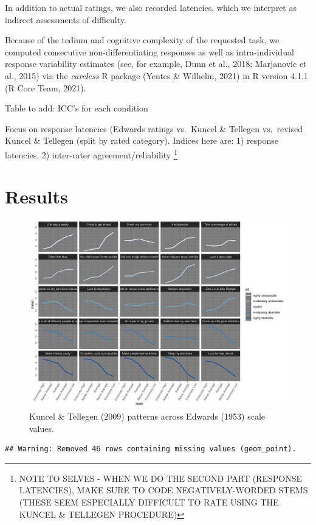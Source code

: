 \documentclass[
  ,man]{apa6}
\begin{document}
In addition to actual ratings, we also recorded latencies, which we interpret as indirect assessments of difficulty.

Because of the tedium and cognitive complexity of the requested task, we computed consecutive non-differentiating responses as well as intra-individual response variability estimates (see, for example, Dunn et al., 2018; Marjanovic et al., 2015) via the \emph{careless} R package (Yentes \& Wilhelm, 2021) in R version 4.1.1 (R Core Team, 2021).

Table to add: ICC's for each condition

Focus on response latencies (Edwards ratings vs.~Kuncel \& Tellegen vs.~revised Kuncel \& Tellegen (split by rated category). Indices here are: 1) response latencies, 2) inter-rater agreement/reliability \footnote{NOTE TO SELVES - WHEN WE DO THE SECOND PART (RESPONSE LATENCIES), MAKE SURE TO CODE NEGATIVELY-WORDED STEMS (THESE SEEM ESPECIALLY DIFFICULT TO RATE USING THE KUNCEL \& TELLEGEN PROCEDURE)}

\hypertarget{results-2}{%
\section{Results}\label{results-2}}

\begin{figure}
\centering
\includegraphics{KuncelTellegen_files/figure-latex/Figure2-1.pdf}
\caption{\label{fig:Figure2}Kuncel \& Tellegen (2009) patterns across Edwards (1953) scale values.}
\end{figure}

\begin{verbatim}
## Warning: Removed 46 rows containing missing values (geom_point).
\end{verbatim}
\end{document}
